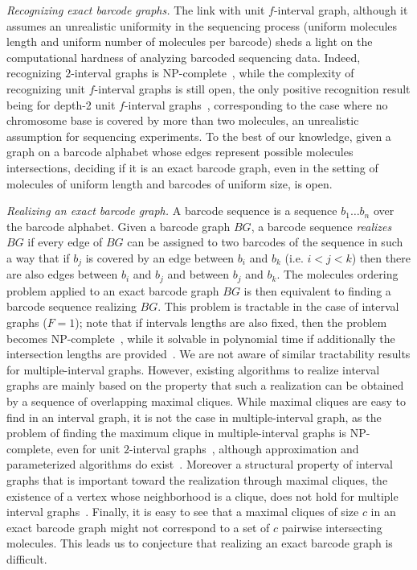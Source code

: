 \smallskip\noindent\textit{Recognizing exact barcode graphs.}
The link with unit $f$-interval graph, although it assumes an unrealistic uniformity in the sequencing process (uniform molecules length and uniform number of molecules per barcode) sheds a light on the computational hardness of analyzing barcoded sequencing data. 
Indeed, recognizing $2$-interval graphs is NP-complete~\cite{WestS_1984}, while the complexity of recognizing unit $f$-interval graphs is still open,  the only positive recognition result being for depth-2 unit $f$-interval graphs~\cite{Jiang_2013}, corresponding to the case where no chromosome base is covered by more than two molecules, an unrealistic assumption for sequencing experiments. 
To the best of our knowledge, given a graph on a barcode alphabet whose edges represent possible molecules intersections, deciding if it is an exact barcode graph, even in the setting of molecules of uniform length and barcodes of uniform size, is open.

\smallskip\noindent\textit{Realizing an exact barcode graph.}
A barcode sequence is a sequence $b_1 \dots b_n$ over the barcode alphabet. 
Given a barcode graph $BG$, a barcode sequence \textit{realizes} $BG$ if every edge of $BG$ can be assigned to two barcodes of the sequence in such a way that if $b_j$ is covered by an edge between $b_i$ and $b_k$ (i.e. $i<j<k$) then there are also edges between $b_i$ and $b_j$ and between $b_j$ and $b_k$.
The molecules ordering problem applied to an exact barcode graph $BG$ is then equivalent to finding a barcode sequence realizing $BG$. 
This problem is tractable in the case of interval graphs ($F=1$); note that if intervals lengths are also fixed, then the problem becomes NP-complete~\cite{PeerS_1997}, while it solvable in polynomial time if additionally the intersection lengths are provided~\cite{KoblerKW_2015}.
We are not aware of similar tractability results for multiple-interval graphs.
However, existing algorithms to realize interval graphs are mainly based on the property that such a realization can be obtained by a sequence of overlapping maximal cliques.
While maximal cliques are easy to find in an interval graph, it is not the case in multiple-interval graph, as the problem of finding the maximum clique in multiple-interval graphs is NP-complete, even for unit $2$-interval graphs~\cite{FrancisGO_2015}, although approximation and parameterized algorithms do exist~\cite{ButmanHLR_2007,FellowsHRV_2009}.
Moreover a structural property of interval graphs that is important toward the realization through maximal cliques, the existence of a vertex whose neighborhood is a clique, does not hold for multiple interval graphs~\cite{Bar-YehudaHNSS_2006}.
Finally, it is easy to see that a maximal cliques of size $c$ in an exact barcode graph might not correspond to a set of $c$ pairwise intersecting molecules.
This leads us to conjecture that realizing an exact barcode graph is difficult.

